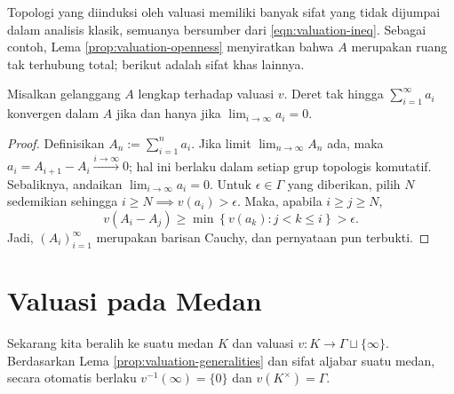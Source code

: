 Topologi yang diinduksi oleh valuasi memiliki banyak sifat yang tidak dijumpai dalam analisis klasik, semuanya bersumber dari \eqref{eqn:valuation-ineq}. Sebagai contoh, Lema \ref{prop:valuation-openness} menyiratkan bahwa $A$ merupakan ruang tak terhubung total; berikut adalah sifat khas lainnya.
\begin{proposition}\label{prop:ultrametric-series}
	Misalkan gelanggang $A$ lengkap terhadap valuasi $v$. Deret tak hingga $\sum_{i=1}^\infty a_i$ konvergen dalam $A$ jika dan hanya jika $\lim_{i \to \infty} a_i = 0$.
\end{proposition}
\begin{proof}
	Definisikan $A_n := \sum_{i=1}^n a_i$. Jika limit $\displaystyle\lim_{n \to \infty} A_n$ ada, maka $a_i = A_{i+1} - A_i \xrightarrow{i \to \infty} 0$; hal ini berlaku dalam setiap grup topologis komutatif. Sebaliknya, andaikan $\displaystyle\lim_{i \to \infty} a_i = 0$. Untuk $\epsilon \in \Gamma$ yang diberikan, pilih $N$ sedemikian sehingga $i \geq N \implies v(a_i) > \epsilon$. Maka, apabila $i \geq j \geq N$,
	\[ v(A_i - A_j) \geq \min\left\{ v(a_k) : j < k \leq i \right\} > \epsilon. \]
	Jadi, $(A_i)_{i=1}^\infty$ merupakan barisan Cauchy, dan pernyataan pun terbukti.
\end{proof}

\section{Valuasi pada Medan}\label{sec:valued-field}
Sekarang kita beralih ke suatu medan $K$ dan valuasi $v: K \to \Gamma \sqcup \{\infty\}$. Berdasarkan Lema \ref{prop:valuation-generalities} dan sifat aljabar suatu medan, secara otomatis berlaku $v^{-1}(\infty)=\{0\}$ dan $v(K^\times) = \Gamma$.

